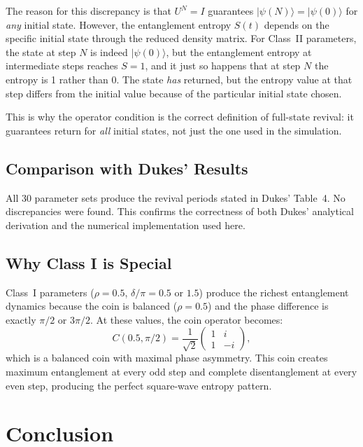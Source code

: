 \documentclass[12pt,a4paper]{article}
\begin{document}
The reason for this discrepancy is that $U^N = I$ guarantees $|\psi(N)\rangle = |\psi(0)\rangle$ for \emph{any} initial state. However, the entanglement entropy $S(t)$ depends on the specific initial state through the reduced density matrix. For Class~II parameters, the state at step $N$ is indeed $|\psi(0)\rangle$, but the entanglement entropy at intermediate steps reaches $S=1$, and it just so happens that at step $N$ the entropy is 1 rather than 0. The state \emph{has} returned, but the entropy value at that step differs from the initial value because of the particular initial state chosen.

This is why the operator condition is the correct definition of full-state revival: it guarantees return for \emph{all} initial states, not just the one used in the simulation.

\subsection{Comparison with Dukes' Results}

All 30 parameter sets produce the revival periods stated in Dukes' Table~4. No discrepancies were found. This confirms the correctness of both Dukes' analytical derivation and the numerical implementation used here.

\subsection{Why Class I is Special}

Class~I parameters ($\rho = 0.5$, $\delta/\pi = 0.5$ or $1.5$) produce the richest entanglement dynamics because the coin is balanced ($\rho = 0.5$) and the phase difference is exactly $\pi/2$ or $3\pi/2$. At these values, the coin operator becomes:
\begin{equation}
    C(0.5, \pi/2) = \frac{1}{\sqrt{2}}
    \begin{pmatrix}
        1 & i \\
        1 & -i
    \end{pmatrix},
    \label{eq:classI_coin}
\end{equation}
which is a balanced coin with maximal phase asymmetry. This coin creates maximum entanglement at every odd step and complete disentanglement at every even step, producing the perfect square-wave entropy pattern.

\section{Conclusion}
\end{document}
